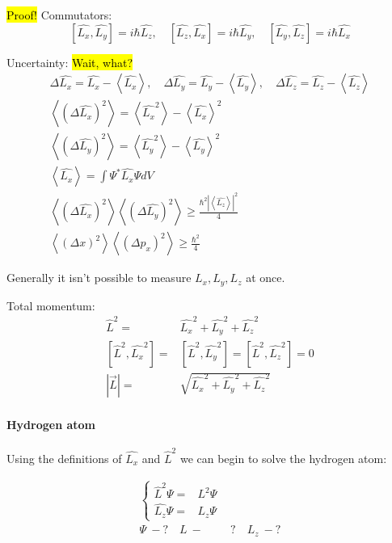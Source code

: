 	\hl{Proof!} Commutators:
	\begin{equation}
	\left[\hat{L_x}, \hat{L_y}\right] = i\hbar\hat{L_z}, \quad
	\left[\hat{L_z}, \hat{L_x}\right] = i\hbar\hat{L_y}, \quad
	\left[\hat{L_y}, \hat{L_z}\right] = i\hbar\hat{L_x}
	\end{equation}
	
	Uncertainty: \hl{Wait, what?}
	\begin{align}
		\Delta \hat{L_x} = \hat{L_x} - \left<\hat{L_x} \right>, \quad
		\Delta \hat{L_y} = \hat{L_y} - \left<\hat{L_y} \right>, \quad
		\Delta \hat{L_z} = \hat{L_z} - \left<\hat{L_z} \right> \\
		\left<(\Delta\hat{L_x})^2 \right> = \left<\hat{L_x}^2 \right> - \left<\hat{L_x} \right>^2 \\
		\left<(\Delta\hat{L_y})^2 \right> = \left<\hat{L_y}^2 \right> - \left<\hat{L_y} \right>^2 \\
		\left<\hat{L_x} \right> = \int \Psi^* \hat{L_x} \Psi dV \\ 
		\left<(\Delta\hat{L_x})^2 \right>\left<(\Delta\hat{L_y})^2 \right> \geq \frac{\hbar^2|\left<\hat{L_z}\right>|^2}{4} \\
		\left<(\Delta x)^2 \right>\left<(\Delta p_x)^2 \right> \geq \frac{\hbar^2}{4} \nonumber				
	\end{align}
	
	Generally it isn't possible to measure $L_x, L_y, L_z$ at once. 
	
	Total momentum:
	\begin{align}
		\hat{L}^2 =& \hat{L_x}^2 + \hat{L_y}^2 + \hat{L_z}^2 \\
		\left[\hat{L}^2, \hat{L_x}^2\right] =& \left[\hat{L}^2, \hat{L_y}^2\right] = \left[\hat{L}^2, \hat{L_z}^2\right] = 0 \\
		|\vec{L}| =& \sqrt{\hat{L_x}^2 + \hat{L_y}^2 + \hat{L_z}^2}								
	\end{align}
	
	\paragraph{Hydrogen atom}		
	Using the definitions of $\hat{L_x}$ and $\hat{L}^2$ we can begin to solve the hydrogen atom:
	
	\begin{align}
		\left\{ \begin{aligned}
			\hat{L}^2 \Psi =& L^2 \Psi \\
			\hat{L_z} \Psi =& L_z \Psi  
		\end{aligned} \right. \\
		\Psi~-? \quad L~-&? \quad L_z~-? \nonumber
		\label{hydrogensystem1}
	\end{align}
	

